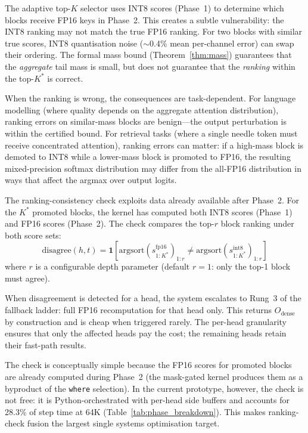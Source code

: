 \documentclass[11pt,a4paper]{article}
\theoremstyle{definition}
\theoremstyle{remark}
\begin{document}
The adaptive top-$K$ selector uses INT8 scores (Phase~1) to determine which blocks receive FP16 keys in Phase~2.  This creates a subtle vulnerability: the INT8 ranking may not match the true FP16 ranking.  For two blocks with similar true scores, INT8 quantisation noise ($\sim$0.4\% mean per-channel error) can swap their ordering.  The formal mass bound (Theorem~\ref{thm:mass}) guarantees that the \emph{aggregate} tail mass is small, but does not guarantee that the \emph{ranking} within the top-$K^*$ is correct.

When the ranking is wrong, the consequences are task-dependent.  For language modelling (where quality depends on the aggregate attention distribution), ranking errors on similar-mass blocks are benign---the output perturbation is within the certified bound.  For retrieval tasks (where a single needle token must receive concentrated attention), ranking errors can matter: if a high-mass block is demoted to INT8 while a lower-mass block is promoted to FP16, the resulting mixed-precision softmax distribution may differ from the all-FP16 distribution in ways that affect the argmax over output logits.

The ranking-consistency check exploits data already available after Phase~2.  For the $K^*$ promoted blocks, the kernel has computed both INT8 scores (Phase~1) and FP16 scores (Phase~2).  The check compares the top-$r$ block ranking under both score sets:
\begin{equation}
  \mathrm{disagree}(h, t) = \mathbf{1}\!\left[\mathrm{argsort}(s^{\mathrm{fp16}}_{1:K^*})_{1:r} \neq \mathrm{argsort}(s^{\mathrm{int8}}_{1:K^*})_{1:r}\right]
\end{equation}
where $r$ is a configurable depth parameter (default $r{=}1$: only the top-1 block must agree).

When disagreement is detected for a head, the system escalates to Rung~3 of the fallback ladder: full FP16 recomputation for that head only.  This returns $O_{\mathrm{dense}}$ by construction and is cheap when triggered rarely.  The per-head granularity ensures that only the affected heads pay the cost; the remaining heads retain their fast-path results.

The check is conceptually simple because the FP16 scores for promoted blocks are already computed during Phase~2 (the mask-gated kernel produces them as a byproduct of the \texttt{where} selection).  In the current prototype, however, the check is not free: it is Python-orchestrated with per-head side buffers and accounts for 28.3\% of step time at 64K (Table~\ref{tab:phase_breakdown}).  This makes ranking-check fusion the largest single systems optimisation target.
\end{document}
